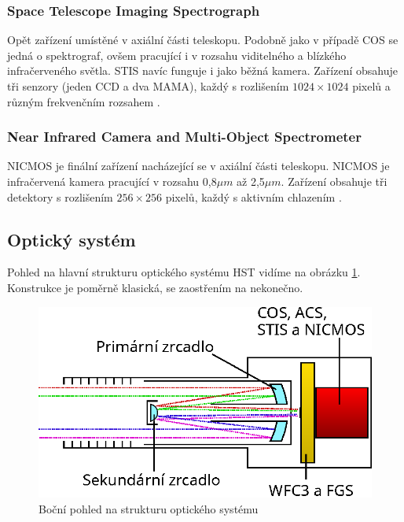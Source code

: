 \documentclass[a4paper,11pt]{article}
\begin{document}
\subsubsection{Space Telescope Imaging Spectrograph}
Opět zařízení umístěné v axiální části teleskopu. Podobně jako v případě COS se jedná o spektrograf, ovšem pracující i v rozsahu viditelného a blízkého infračerveného světla. STIS navíc funguje i jako běžná kamera. Zařízení obsahuje tři senzory (jeden CCD a dva MAMA), každý s rozlišením $1024 \times 1024$ pixelů a různým frekvenčním rozsahem \cite{stsciStisDetectors}\cite{hubblesiteStis}.

\subsubsection{Near Infrared Camera and Multi-Object Spectrometer}

NICMOS je finální zařízení nacházející se v axiální části teleskopu. NICMOS je infračervená kamera pracující v rozsahu 0,8$\mu m$ až 2,5$\mu m$. Zařízení obsahuje tři detektory s rozlišením $256 \times 256$ pixelů, každý s aktivním chlazením \cite{stsciNicmosDetectors}\cite{stsciNicmosPerformance}.

\subsection{Optický systém}

Pohled na hlavní strukturu optického systému HST vidíme na obrázku \ref{hubble-structure}. Konstrukce je poměrně klasická, se zaostřením na nekonečno.

\begin{figure}[h]
	\begin{center}
		\includegraphics[width=12cm]{hubble-structure.eps}
		\caption{Boční pohled na strukturu optického systému}
		\label{hubble-structure}
	\end{center}
\end{figure}
\end{document}

